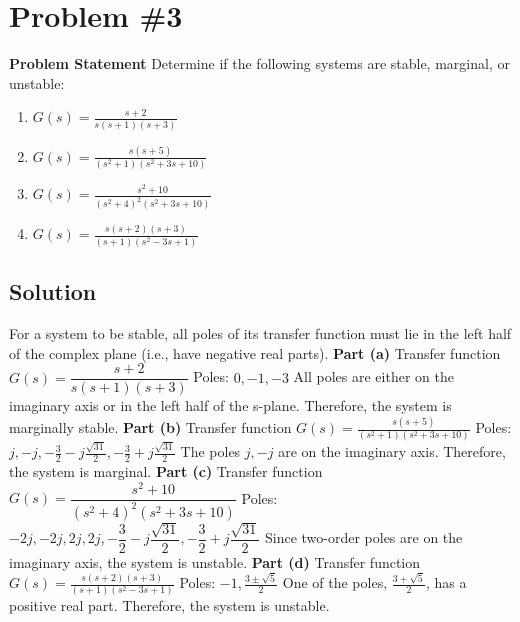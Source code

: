 \documentclass[12pt]{article}
\begin{document}
\section*{Problem \#3}

\textbf{Problem Statement}
Determine if the following systems are stable, marginal, or unstable:
\begin{enumerate}
    \item \( G(s) = \frac{s + 2}{s(s + 1)(s + 3)} \)
    \item \( G(s) = \frac{s(s + 5)}{(s^2 + 1)(s^2 + 3s + 10)} \)
    \item \( G(s) = \frac{s^2 + 10}{(s^2 + 4)^2(s^2 + 3s + 10)} \)
    \item \( G(s) = \frac{s(s + 2)(s + 3)}{(s + 1)(s^2 - 3s + 1)} \)
\end{enumerate}

\subsection*{Solution}

For a system to be stable, all poles of its transfer function must lie in the left half of the complex plane (i.e., have negative real parts).
\newline\newline
\textbf{Part (a)}
\newline
Transfer function \( G(s) = \dfrac{s + 2}{s(s + 1)(s + 3)} \)
\newline
Poles: \(0, -1, -3\)
\newline
All poles are either on the imaginary axis or in the left half of the s-plane. Therefore, the system is marginally stable.
\newline\newline
\textbf{Part (b)}
\newline
Transfer function \( G(s) = \frac{s(s + 5)}{(s^2 + 1)(s^2 + 3s + 10)} \)
\newline
Poles: \(j, -j, -\frac{3}{2} - j\frac{\sqrt{31}}{2}, -\frac{3}{2} + j\frac{\sqrt{31}}{2} \)
\newline
The poles \(j, -j\) are on the imaginary axis. Therefore, the system is marginal.
\newline\newline
\textbf{Part (c)}
\newline
Transfer function \( G(s) = \dfrac{s^2 + 10}{(s^2 + 4)^2(s^2 + 3s + 10)} \)
\newline
Poles: \( -2j, -2j, 2j, 2j, -\dfrac{3}{2} - j\dfrac{\sqrt{31}}{2}, -\dfrac{3}{2} + j\dfrac{\sqrt{31}}{2} \)
\newline
Since two-order poles are on the imaginary axis, the system is unstable.
\newline\newline
\textbf{Part (d)}
\newline
Transfer function \( G(s) = \frac{s(s + 2)(s + 3)}{(s + 1)(s^2 - 3s + 1)} \)
\newline
Poles: \( -1, \frac{3 \pm \sqrt{5}}{2} \)
\newline
One of the poles, \( \frac{3 + \sqrt{5}}{2} \), has a positive real part. Therefore, the system is unstable.
\newpage
\end{document}
